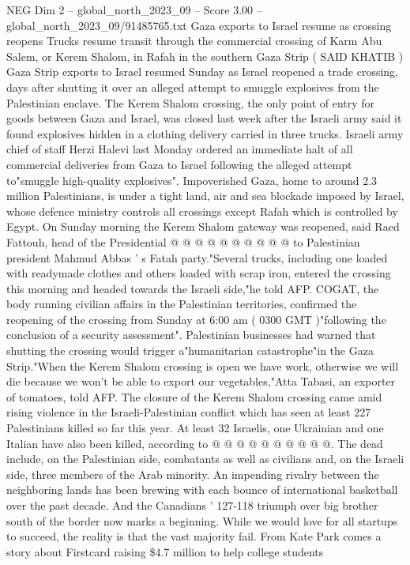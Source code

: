 \begin{textsample}{NEG Dim 2 – global\_north\_2023\_09 – Score 3.00 – global\_north\_2023\_09/91485765.txt}  \label{ex:f2_neg_308}
Gaza exports to Israel resume as crossing reopens Trucks resume transit through the commercial crossing of Karm Abu Salem, or Kerem Shalom, in Rafah in the southern Gaza Strip ( SAID KHATIB ) Gaza Strip exports to Israel resumed Sunday as Israel reopened a trade crossing, days after shutting it over an alleged attempt to smuggle explosives from the Palestinian enclave.
The Kerem Shalom crossing, the only point of entry for goods between Gaza and Israel, was closed last week after the Israeli army said it found explosives hidden in a clothing delivery carried in three trucks.
Israeli army chief of staff Herzi Halevi last Monday ordered an immediate halt of all commercial deliveries from Gaza to Israel following the alleged attempt to"smuggle high-quality explosives".
Impoverished Gaza, home to around 2.3 million Palestinians, is under a tight land, air and sea blockade imposed by Israel, whose defence ministry controls all crossings except Rafah which is controlled by Egypt.
On Sunday morning the Kerem Shalom gateway was reopened, said Raed Fattouh, head of the Presidential @ @ @ @ @ @ @ @ @ @ to Palestinian president Mahmud Abbas ' s Fatah party."Several trucks, including one loaded with readymade clothes and others loaded with scrap iron, entered the crossing this morning and headed towards the Israeli side,"he told AFP.
COGAT, the body running civilian affairs in the Palestinian territories, confirmed the reopening of the crossing from Sunday at 6:00 am ( 0300 GMT )"following the conclusion of a security assessment".
Palestinian businesses had warned that shutting the crossing would trigger a"humanitarian catastrophe"in the Gaza Strip."When the Kerem Shalom crossing is open we have work, otherwise we will die because we won't be able to export our vegetables,"Atta Tabasi, an exporter of tomatoes, told AFP.
The closure of the Kerem Shalom crossing came amid rising violence in the Israeli-Palestinian conflict which has seen at least 227 Palestinians killed so far this year.
At least 32 Israelis, one Ukrainian and one Italian have also been killed, according to @ @ @ @ @ @ @ @ @ @.
The dead include, on the Palestinian side, combatants as well as civilians and, on the Israeli side, three members of the Arab minority.
An impending rivalry between the neighboring lands has been brewing with each bounce of international basketball over the past decade.
And the Canadians ' 127-118 triumph over big brother south of the border now marks a beginning.
While we would love for all startups to succeed, the reality is that the vast majority fail.
From Kate Park comes a story about Firstcard raising \$4.7 million to help college students

\end{textsample}
